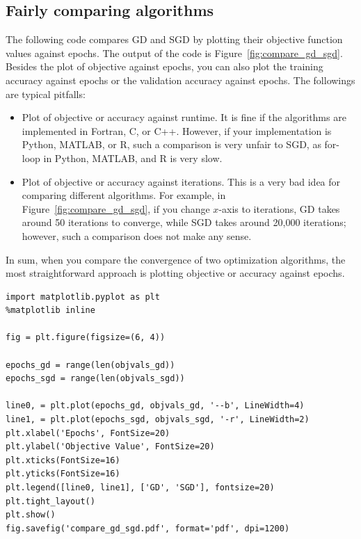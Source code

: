 \documentclass[11pt]{article}
\numberwithin{equation}{section}
\begin{document}
\subsection{Fairly comparing algorithms}

The following code compares GD and SGD by plotting their objective function values against epochs.
The output of the code is Figure~\ref{fig:compare_gd_sgd}.
Besides the plot of objective against epochs,
you can also plot the training accuracy against epochs or the validation accuracy against epochs.
The followings are typical pitfalls:
\begin{itemize}
	\item 
	Plot of objective or accuracy against runtime.
	It is fine if the algorithms are implemented in Fortran, C, or C++.
	However, if your implementation is Python, MATLAB, or R, such a comparison is very unfair to SGD, as for-loop  in Python, MATLAB, and R is very slow.
	\item
	Plot of objective or accuracy against iterations.
	This is a very bad idea for comparing different algorithms.
	For example, in Figure~\ref{fig:compare_gd_sgd}, if you change $x$-axis to iterations, GD takes around 50 iterations to converge, while SGD takes around 20,000 iterations;
	however, such a comparison does not make any sense.
\end{itemize}
In sum, when you compare the convergence of two optimization algorithms, the most straightforward approach is plotting objective or accuracy against epochs.



\vspace{3mm}
\begin{lstlisting}
import matplotlib.pyplot as plt
%matplotlib inline

fig = plt.figure(figsize=(6, 4))

epochs_gd = range(len(objvals_gd))
epochs_sgd = range(len(objvals_sgd))

line0, = plt.plot(epochs_gd, objvals_gd, '--b', LineWidth=4)
line1, = plt.plot(epochs_sgd, objvals_sgd, '-r', LineWidth=2)
plt.xlabel('Epochs', FontSize=20)
plt.ylabel('Objective Value', FontSize=20)
plt.xticks(FontSize=16)
plt.yticks(FontSize=16)
plt.legend([line0, line1], ['GD', 'SGD'], fontsize=20)
plt.tight_layout()
plt.show()
fig.savefig('compare_gd_sgd.pdf', format='pdf', dpi=1200)
\end{lstlisting}
\vspace{3mm}
\end{document}

